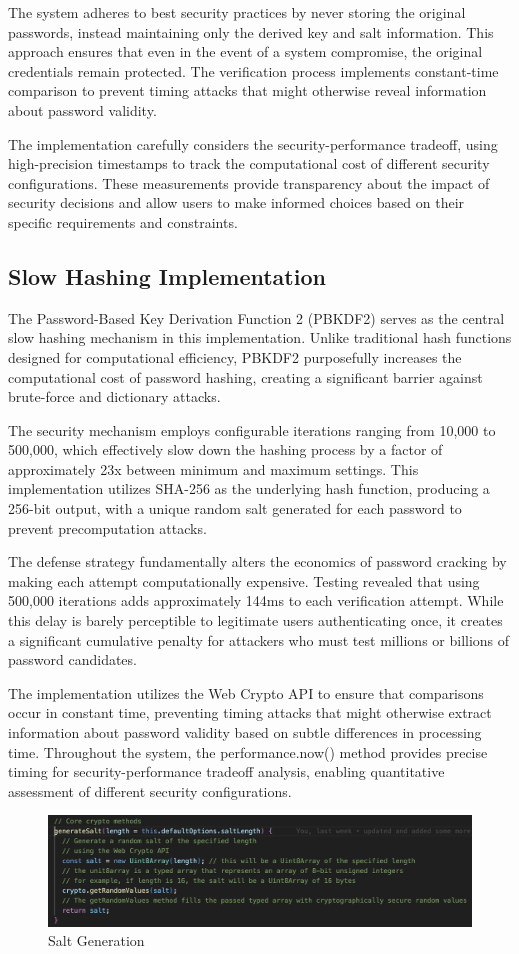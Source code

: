 \documentclass[11pt,a4paper]{article}
\begin{document}
The system adheres to best security practices by never storing the original passwords, instead maintaining only the derived key and salt information. This approach ensures that even in the event of a system compromise, the original credentials remain protected. The verification process implements constant-time comparison to prevent timing attacks that might otherwise reveal information about password validity.

The implementation carefully considers the security-performance tradeoff, using high-precision timestamps to track the computational cost of different security configurations. These measurements provide transparency about the impact of security decisions and allow users to make informed choices based on their specific requirements and constraints.


\subsection{Slow Hashing Implementation}
The Password-Based Key Derivation Function 2 (PBKDF2) serves as the central slow hashing mechanism in this implementation. Unlike traditional hash functions designed for computational efficiency, PBKDF2 purposefully increases the computational cost of password hashing, creating a significant barrier against brute-force and dictionary attacks.

The security mechanism employs configurable iterations ranging from 10,000 to 500,000, which effectively slow down the hashing process by a factor of approximately 23x between minimum and maximum settings. This implementation utilizes SHA-256 as the underlying hash function, producing a 256-bit output, with a unique random salt generated for each password to prevent precomputation attacks.

The defense strategy fundamentally alters the economics of password cracking by making each attempt computationally expensive. Testing revealed that using 500,000 iterations adds approximately 144ms to each verification attempt. While this delay is barely perceptible to legitimate users authenticating once, it creates a significant cumulative penalty for attackers who must test millions or billions of password candidates.

The implementation utilizes the Web Crypto API to ensure that comparisons occur in constant time, preventing timing attacks that might otherwise extract information about password validity based on subtle differences in processing time. Throughout the system, the performance.now() method provides precise timing for security-performance tradeoff analysis, enabling quantitative assessment of different security configurations.
\begin{figure}[htbp]
  \centering
  \includegraphics[width=1\linewidth]{images/Salt.png}
  \caption{Salt Generation}
  \label{Salt}
\end{figure}
\end{document}
